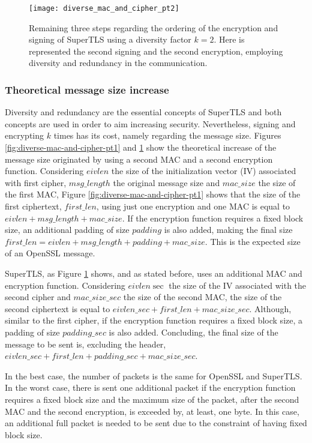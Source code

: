 \documentclass{sig-alternate-05-2015}
\begin{document}
\begin{figure}[t]
\texttt{[image: diverse\_mac\_and\_cipher\_pt2]}
\centering
\caption{Remaining three steps regarding the ordering of the encryption and signing of SuperTLS using a diversity factor $k = 2$. Here is represented the second signing and the second encryption, employing diversity and redundancy in the communication.}
\label{fig:diverse-mac-and-cipher-pt2}
\end{figure}

\subsubsection{Theoretical message size increase}
\label{subsubsec:theretical-msg-size}

Diversity and redundancy are the essential concepts of SuperTLS and both concepts are used in order to aim increasing security. Nevertheless, signing and encrypting $k$ times has its cost, namely regarding the message size.
Figures \ref{fig:diverse-mac-and-cipher-pt1} and \ref{fig:diverse-mac-and-cipher-pt2} show the theoretical increase of the message size originated by using a second MAC and a second encryption function. Considering $eivlen$ the size of the initialization vector (IV) associated with first cipher, $msg\_length$ the original message size and $mac\_size$ the size of the first MAC, Figure \ref{fig:diverse-mac-and-cipher-pt1} shows that the size of the first ciphertext, $first\_len$, using just one encryption and one MAC is equal to $eivlen+msg\_length+mac\_size$. If the encryption function requires a fixed block size, an additional padding of size $padding$ is also added, making the final size $first\_len=eivlen+msg\_length+padding+mac\_size$. This is the expected size of an OpenSSL message.

SuperTLS, as Figure \ref{fig:diverse-mac-and-cipher-pt2} shows, and as stated before, uses an additional MAC and encryption function. Considering $eivlen\sec$ the size of the IV associated with the second cipher and $mac\_size\_sec$ the size of the second MAC, the size of the second ciphertext is equal to $eivlen\_sec+first\_len+mac\_size\_sec$. Although, similar to the first cipher, if the encryption function requires a fixed block size, a padding of size $padding\_sec$ is also added. Concluding, the final size of the message to be sent is, excluding the header, $eivlen\_sec+first\_len+padding\_sec+mac\_size\_sec$.

In the best case, the number of packets is the same for OpenSSL and SuperTLS. In the worst case, there is sent one additional packet if the encryption function requires a fixed block size and the maximum size of the packet, after the second MAC and the second encryption, is exceeded by, at least, one byte. In this case, an additional full packet is needed to be sent due to the constraint of having fixed block size.
\end{document}
